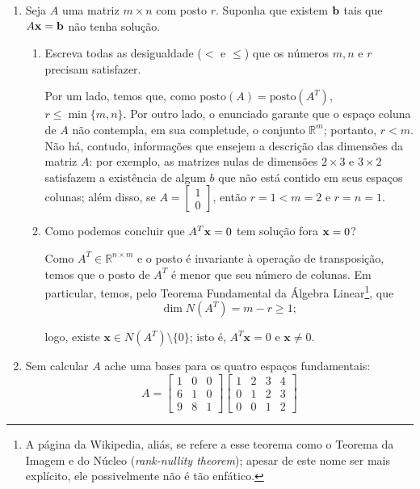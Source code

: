\documentclass[leqno]{article}
\begin{document}
\begin{enumerate}

\item Seja $A$ uma matriz $m \times n$ com posto $r$. Suponha que existem $\mathbf{b}$ tais que $A \mathbf{x} = \mathbf{b}$ não tenha solução.

\begin{enumerate}

\item Escreva todas as desigualdade ($<$ e $\leq$) que os números $m,n$ e $r$ precisam satisfazer.

	\begin{sol} 
		Por um lado, temos que, como $\mathrm{posto}(A) = \mathrm{posto}(A^{T})$, $r \le \min\{m, n\}$. Por outro lado, o enunciado garante que o espaço coluna de $A$ não contempla, em sua completude, o conjunto $\mathbb{R}^{m}$; portanto, $r < m$. Não há, contudo, informações que ensejem a descrição das dimensões da matriz $A$: por exemplo, as matrizes nulas de dimensões $2 \times 3$ e $3 \times 2$ satisfazem a existência de algum $b$ que não está contido em seus espaços colunas; além disso, se $A = \begin{bmatrix} 1 \\ 0 \end{bmatrix}$, então $r = 1 < m = 2$ e $r = n = 1$.  
	\end{sol} 

\item Como podemos concluir que $A^T \mathbf{x} = 0$ tem solução fora $\mathbf{x} = 0$?

	\begin{sol} 
		Como $A^{T} \in \mathbb{R}^{n \times m}$ e o posto é invariante à operação de transposição, temos que o posto de $A^{T}$ é menor que seu número de colunas. Em particular, temos, pelo Teorema Fundamental da Álgebra Linear\footnote{A página da Wikipedia, aliás, se refere a esse teorema como o Teorema da Imagem e do Núcleo (\textit{rank-nullity theorem}); apesar de este nome ser mais explícito, ele possivelmente não é tão enfático.}, que 
		\begin{equation*} 
			\dim N(A^{T}) = m - r \ge 1;    
		\end{equation*} 

		\noindent logo, existe $\mathbf{x} \in N(A^{T}) \setminus \{0\}$; isto é, $A^{T} \mathbf{x} = 0$ e $\mathbf{x} \neq 0$. 
	\end{sol} 
\end{enumerate}

\item Sem calcular $A$ ache uma bases para os quatro espaços fundamentais:
$$A = \begin{bmatrix}
1 & 0 & 0 \\
6 & 1 & 0 \\
9 & 8 & 1
\end{bmatrix}
\begin{bmatrix}
1 & 2 & 3 & 4 \\
0 & 1 & 2 & 3 \\
0 & 0 & 1 & 2
\end{bmatrix}$$


\end{enumerate}
\end{document}
